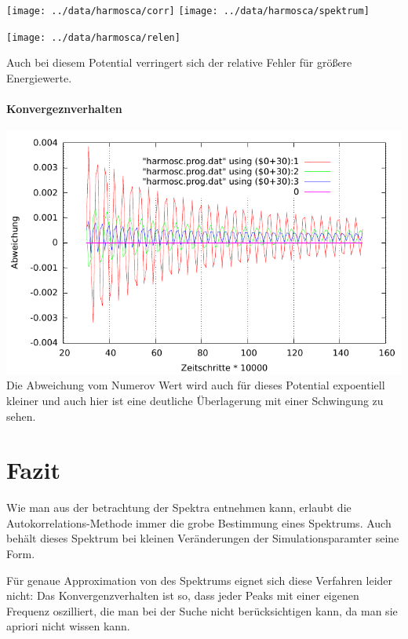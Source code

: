 \documentclass[10pt,a4paper,german]{scrartcl}
\begin{document}
		  	\texttt{[image: ../data/harmosca/corr]}
    		\texttt{[image: ../data/harmosca/spektrum]}
			  
	  		\texttt{[image: ../data/harmosca/relen]}
	  		
	  		Auch bei diesem Potential verringert sich der relative Fehler 
	  		für größere Energiewerte.
	  		
  			\paragraph*{Konvergeznverhalten}
  			  \includegraphics[scale=.62]{../static/harmosc_konv.pdf}
  			  Die Abweichung vom Numerov Wert wird auch für dieses Potential
  			  expoentiell kleiner und auch hier ist eine deutliche Überlagerung
  		    mit einer Schwingung zu sehen.
  		    
	\section{Fazit}
		Wie man aus der betrachtung der Spektra entnehmen kann, erlaubt die
		Autokorrelations-Methode immer die grobe Bestimmung eines Spektrums.
		Auch behält dieses Spektrum bei kleinen Veränderungen der 
		Simulationsparamter seine Form.
		
		
		Für genaue Approximation von des Spektrums eignet sich diese Verfahren
		leider nicht: Das Konvergenzverhalten ist so, dass jeder Peaks
		mit einer eigenen Frequenz oszilliert, die man bei der Suche nicht 
		berücksichtigen kann, da man sie apriori nicht wissen kann.
		
				
			
\end{document}
